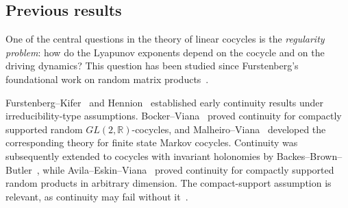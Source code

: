 \documentclass[11pt,a4paper]{amsart}
\theoremstyle{definition}
\theoremstyle{remark}
\numberwithin{equation}{section}
\newcommand{\1}{\boldsymbol 1}
\begin{document}
\subsection{Previous results}
One of the central questions in the theory of linear cocycles is the
\emph{regularity problem}: how do the Lyapunov exponents depend on the
cocycle and on the driving dynamics? This question has been studied
since Furstenberg's foundational work on random matrix
products~\cite{Furstenberg63}.

Furstenberg--Kifer~\cite{FK} and Hennion~\cite{Hennion84} established
early continuity results under irreducibility-type assumptions.
Bocker--Viana~\cite{BV17} proved continuity for compactly supported
random \(GL(2,\mathbb R)\)-cocycles, and Malheiro--Viana~\cite{MV} developed the corresponding theory for finite state Markov cocycles. Continuity was subsequently extended to cocycles with invariant holonomies by Backes--Brown--Butler~\cite{BBB18}, while Avila--Eskin--Viana~\cite{AEV} proved continuity for compactly supported random products in arbitrary dimension. The compact-support assumption is relevant, as continuity may fail without it~\cite{SV20}.
\end{document}
